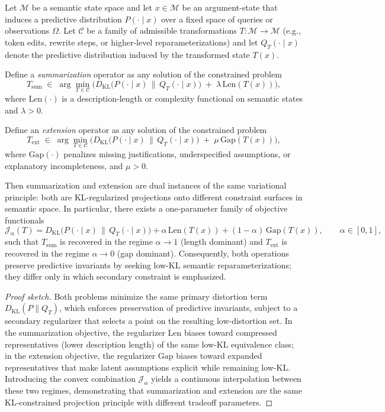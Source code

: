 \documentclass[11pt,letterpaper]{article}
\begin{document}
\begin{lemma}
Let $\mathcal{M}$ be a semantic state space and let $x \in \mathcal{M}$ be an
argument-state that induces a predictive distribution $P(\cdot \mid x)$ over a
fixed space of queries or observations $\Omega$. Let $\mathcal{C}$ be a family
of admissible transformations $T:\mathcal{M}\to\mathcal{M}$ (e.g., token edits,
rewrite steps, or higher-level reparameterizations) and let $Q_T(\cdot \mid x)$
denote the predictive distribution induced by the transformed state $T(x)$.

Define a \emph{summarization} operator as any solution of the constrained problem
\[
T_{\mathrm{sum}}
\;\in\;
\arg\min_{T \in \mathcal{C}}
\Big(
D_{\mathrm{KL}}\!\big(P(\cdot\mid x)\,\|\,Q_T(\cdot\mid x)\big)
\;+\;
\lambda\,\mathrm{Len}(T(x))
\Big),
\]
where $\mathrm{Len}(\cdot)$ is a description-length or complexity functional on
semantic states and $\lambda>0$.

Define an \emph{extension} operator as any solution of the constrained problem
\[
T_{\mathrm{ext}}
\;\in\;
\arg\min_{T \in \mathcal{C}}
\Big(
D_{\mathrm{KL}}\!\big(P(\cdot\mid x)\,\|\,Q_T(\cdot\mid x)\big)
\;+\;
\mu\,\mathrm{Gap}(T(x))
\Big),
\]
where $\mathrm{Gap}(\cdot)$ penalizes missing justifications, underspecified
assumptions, or explanatory incompleteness, and $\mu>0$.

Then summarization and extension are dual instances of the same variational
principle: both are KL-regularized projections onto different constraint
surfaces in semantic space. In particular, there exists a one-parameter family
of objective functionals
\[
\mathcal{J}_{\alpha}(T)
=
D_{\mathrm{KL}}\!\big(P(\cdot\mid x)\,\|\,Q_T(\cdot\mid x)\big)
+
\alpha\,\mathrm{Len}(T(x))
+
(1-\alpha)\,\mathrm{Gap}(T(x)),
\qquad \alpha\in[0,1],
\]
such that $T_{\mathrm{sum}}$ is recovered in the regime $\alpha\to 1$ (length
dominant) and $T_{\mathrm{ext}}$ is recovered in the regime $\alpha\to 0$ (gap
dominant). Consequently, both operations preserve predictive invariants by
seeking low-KL semantic reparameterizations; they differ only in which
secondary constraint is emphasized.
\end{lemma}

\begin{proof}[Proof sketch]
Both problems minimize the same primary distortion term
$D_{\mathrm{KL}}(P\|Q_T)$, which enforces preservation of predictive invariants,
subject to a secondary regularizer that selects a point on the resulting
low-distortion set. In the summarization objective, the regularizer
$\mathrm{Len}$ biases toward compressed representatives (lower description
length) of the same low-KL equivalence class; in the extension objective, the
regularizer $\mathrm{Gap}$ biases toward expanded representatives that make
latent assumptions explicit while remaining low-KL. Introducing the convex
combination $\mathcal{J}_\alpha$ yields a continuous interpolation between these
two regimes, demonstrating that summarization and extension are the same
KL-constrained projection principle with different tradeoff parameters.
\end{proof}
\end{document}
